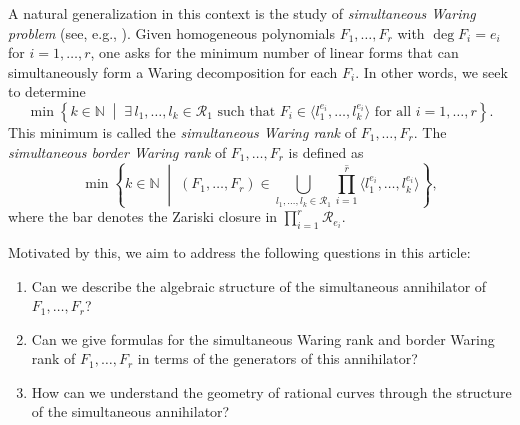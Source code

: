 \documentclass[a4paper, 11pt]{amsart}
\numberwithin{theorem}{section}
\theoremstyle{definition}
\numberwithin{equation}{section}
\begin{document}
A natural generalization in this context is the study of \emph{simultaneous Waring problem} (see, e.g., \cite{carlini_chipalkatti,angelini_galuppi_mella_ottaviani,carlini_ventura_simultaneous}).
Given homogeneous polynomials $F_1, \ldots, F_r$ with $\deg F_i = e_i$ for $i = 1, \dots, r$, one asks for the minimum number of linear forms that can simultaneously form a Waring decomposition for each $F_i$. In other words, we seek to determine
\begin{equation*}
  \min \left\{ k \in \mathbb{N} \;\middle|\; \exists \, l_1, \ldots, l_k \in \mathcal{R}_1 \text{ such that } F_i \in \langle l_1^{e_i}, \ldots, l_k^{e_i} \rangle \text{ for all } i = 1, \ldots, r \right\}.
\end{equation*}
This minimum is called the \emph{simultaneous Waring rank} of $F_1,\dots,F_r$.
The \emph{simultaneous border Waring rank} of $F_1,\dots,F_r$
is defined as
\begin{equation*}
\min\left\{k\in\mathbb N \;\middle|\; (F_1,\dots,F_r)\in \overline{ \bigcup_{l_1,\dots,l_k\in\mathcal R_1} \prod_{i=1}^r \langle l_1^{e_i},\dots,l_k^{e_i}\rangle} \right\},
\end{equation*}
where the bar denotes the Zariski closure in $\prod_{i=1}^r\mathcal R_{e_i}$.

Motivated by this, we aim to address the following questions in this article:
\begin{enumerate}
  \item Can we describe the algebraic structure of the simultaneous annihilator of $F_1, \ldots, F_r$?
  \item Can we give formulas for the simultaneous Waring rank and border Waring rank of $F_1, \ldots, F_r$ in terms of the generators of this annihilator?
  \item How can we understand the geometry of rational curves through the structure of the simultaneous annihilator?
\end{enumerate}
\end{document}
